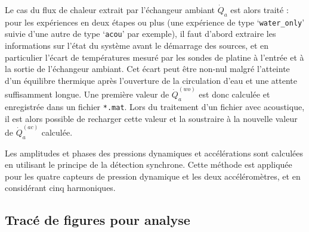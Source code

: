 Le cas du flux de chaleur extrait par l'échangeur ambiant $\dot Q_a$ est alors traité : pour les expériences en deux étapes ou plus (une expérience de type `\texttt{water\_only}' suivie d'une autre de type `\texttt{acou}' par exemple), il faut d'abord extraire les informations sur l'état du système avant le démarrage des sources, et en particulier l'écart de températures mesuré par les sondes de platine à l'entrée et à la sortie de l'échangeur ambiant. Cet écart peut être non-nul malgré l'atteinte d'un équilibre thermique après l'ouverture de la circulation d'eau et une attente suffisamment longue. Une première valeur de $\dot Q_a^{(wo)}$ est donc calculée et enregistrée dans un fichier \texttt{*.mat}. Lors du traitement d'un fichier avec acoustique, il est alors possible de recharger cette valeur et la soustraire à la nouvelle valeur de $\dot Q_a^{(ac)}$ calculée.\smallskip

Les amplitudes et phases des pressions dynamiques et accélérations sont calculées en utilisant le principe de la détection synchrone. Cette méthode est appliquée pour les quatre capteurs de pression dynamique et les deux accéléromètres, et en considérant cinq harmoniques.





\subsection{Tracé de figures pour analyse}

